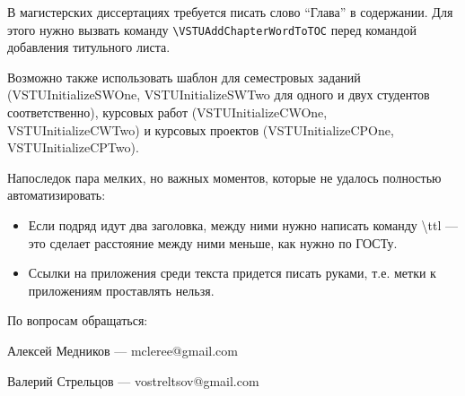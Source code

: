 \documentclass[a4paper,english]{G2-105}
\begin{document}
В магистерских диссертациях требуется писать слово ``Глава'' в содержании.
Для этого нужно вызвать команду \texttt{\scriptsize{}\textbackslash{}VSTUAddChapterWordToTOC}
перед командой добавления титульного листа.

Возможно также использовать шаблон для семестровых заданий (VSTUInitializeSWOne, VSTUInitializeSWTwo для одного и двух студентов соответственно), курсовых
работ (VSTUInitializeCWOne, VSTUInitializeCWTwo) и курсовых проектов (VSTUInitializeCPOne, VSTUInitializeCPTwo).

Напоследок пара мелких, но важных моментов, которые не удалось полностью автоматизировать:
\begin{itemize}
\item Если подряд идут два заголовка, между ними нужно написать команду \textbackslash{}ttl --- это сделает расстояние между ними меньше, как нужно по ГОСТу.
\item Ссылки на приложения среди текста придется писать руками, т.е. метки к приложениям проставлять нельзя.
\end{itemize}

По вопросам обращаться:

Алексей Медников --- mcleree@gmail.com

Валерий Стрельцов --- vostreltsov@gmail.com
\end{document}
